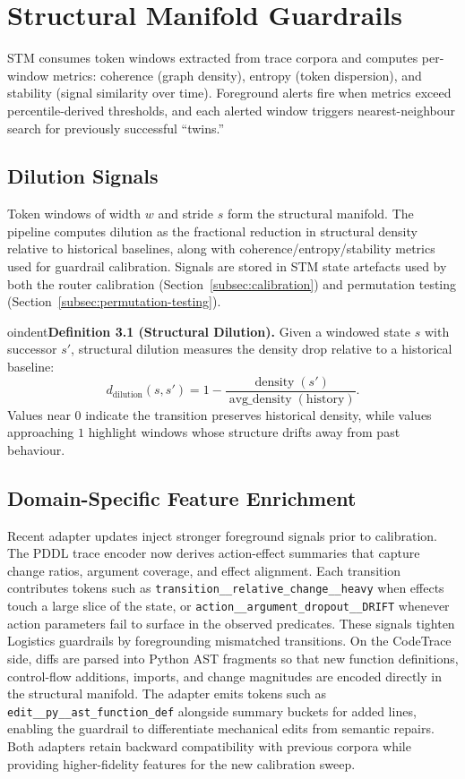 \documentclass[11pt]{article}
\begin{document}
\section{Structural Manifold Guardrails}
STM consumes token windows extracted from trace corpora and computes per-window
metrics: coherence (graph density), entropy (token dispersion), and stability
(signal similarity over time). Foreground alerts fire when metrics exceed
percentile-derived thresholds, and each alerted window triggers nearest-neighbour
search for previously successful ``twins.''

\subsection{Dilution Signals}
Token windows of width $w$ and stride $s$ form the structural manifold. The
pipeline computes dilution as the fractional reduction in structural density
relative to historical baselines, along with coherence/entropy/stability metrics
used for guardrail calibration. Signals are stored in STM state artefacts used by
both the router calibration (Section~\ref{subsec:calibration}) and permutation
testing (Section~\ref{subsec:permutation-testing}).


oindent\textbf{Definition 3.1 (Structural Dilution).} Given a windowed state
$s$ with successor $s'$, structural dilution measures the density drop relative to a
historical baseline:
\begin{equation*}
  d_{\text{dilution}}(s,s') = 1 - \frac{\operatorname{density}(s')}{\operatorname{avg\_density}(\text{history})}.
\end{equation*}
Values near $0$ indicate the transition preserves historical density, while
values approaching $1$ highlight windows whose structure drifts away from past
behaviour.

\subsection{Domain-Specific Feature Enrichment}
Recent adapter updates inject stronger foreground signals prior to calibration.
The PDDL trace encoder now derives action-effect summaries that capture change
ratios, argument coverage, and effect alignment. Each transition contributes
tokens such as \texttt{transition\_\_relative\_change\_\_heavy} when effects
touch a large slice of the state, or \texttt{action\_\_argument\_dropout\_\_DRIFT}
whenever action parameters fail to surface in the observed predicates. These
signals tighten Logistics guardrails by foregrounding mismatched transitions.
On the CodeTrace side, diffs are parsed into Python AST fragments so that new
function definitions, control-flow additions, imports, and change magnitudes are
encoded directly in the structural manifold. The adapter emits tokens such as
\texttt{edit\_\_py\_\_ast\_function\_def} alongside summary buckets for added
lines, enabling the guardrail to differentiate mechanical edits from semantic
repairs. Both adapters retain backward compatibility with previous corpora
while providing higher-fidelity features for the new calibration sweep.
\end{document}
